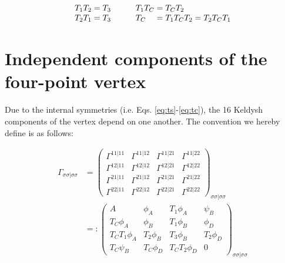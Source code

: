 \documentclass[12pt,a4paper,roman]{article}
\begin{document}
\begin{align}
    \begin{array}{r@{\mskip\thickmuskip}l}
    T_1T_2 &= T_3\\
    T_2T_1 &= T_3
  \end{array} 
  \quad  \quad
  \begin{array}{l@{\mskip\thickmuskip}l}
    T_1T_C &= T_CT_2 \\
    T_C &= T_1T_CT_2 = T_2T_CT_1
  \end{array}
\end{align}

\section*{Independent components of the four-point vertex}
Due to the internal symmetries (i.e. Eqs. \ref{eq:ts}-\ref{eq:tc}), the 16 Keldysh components of the vertex depend on one another. The convention we hereby define is as follows:

\begin{align}
\Gamma_{\sigma\sigma|\sigma\sigma} &=
    \begin{pmatrix}
    \Gamma^{11|11} & \Gamma^{11|12} & \Gamma^{11|21} & \Gamma^{11|22} \\
    \Gamma^{12|11} & \Gamma^{12|12} & \Gamma^{12|21} & \Gamma^{12|22} \\
    \Gamma^{21|11} & \Gamma^{21|12} & \Gamma^{21|21} & \Gamma^{21|22} \\
    \Gamma^{22|11} & \Gamma^{22|12} & \Gamma^{22|21} & \Gamma^{22|22}
    \end{pmatrix}_{\sigma\sigma|\sigma\sigma}  \\
    & = :     \begin{pmatrix}
    A & \phi_A & T_1\phi_A & \psi_B \\
    T_C\phi_A & \phi_B & T_1\phi_B & \phi_D \\
    T_C T_1\phi_A & T_2 \phi_B & T_3\phi_B & T_2\phi_D \\
    T_C\psi_B & T_C\phi_D & T_CT_2\phi_D & 0
    \end{pmatrix}_{\sigma\sigma|\sigma\sigma} 
\end{align}
\end{document}
